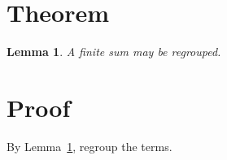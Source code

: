 \section{Theorem}
\newtheorem{lemma}{Lemma}
\begin{lemma}\label{lem:finite}
A finite sum may be regrouped.
\end{lemma}
\section{Proof}
By Lemma~\ref{lem:finite}, regroup the terms.
